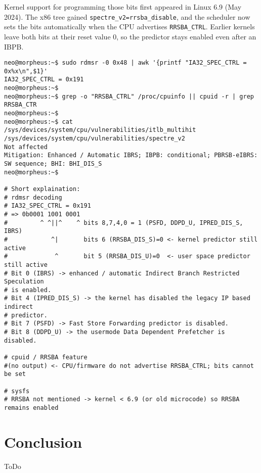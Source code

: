 \documentclass[11pt,a4paper]{article}
\begin{document}
Kernel support for programming those bits first appeared in Linux 6.9 (May 2024).  The x86 tree gained \texttt{spectre\_v2=rrsba\_disable}, and the scheduler now sets the bits automatically when the CPU advertises \texttt{RRSBA\_CTRL}. Earlier kernels leave both bits at their reset value 0, so the predictor stays enabled even after an IBPB.\\

\vspace{-0.5em}
\begin{lstlisting}[style=bash-nonitalic, caption={\texttt{attacker\_rrsba\_injection\_test.sh}}]
neo@morpheus:~$ sudo rdmsr -0 0x48 | awk '{printf "IA32_SPEC_CTRL = 0x%x\n",$1}'
IA32_SPEC_CTRL = 0x191
neo@morpheus:~$
neo@morpheus:~$ grep -o "RRSBA_CTRL" /proc/cpuinfo || cpuid -r | grep RRSBA_CTR
neo@morpheus:~$
neo@morpheus:~$ cat /sys/devices/system/cpu/vulnerabilities/itlb_multihit /sys/devices/system/cpu/vulnerabilities/spectre_v2
Not affected
Mitigation: Enhanced / Automatic IBRS; IBPB: conditional; PBRSB-eIBRS: SW sequence; BHI: BHI_DIS_S
neo@morpheus:~$

# Short explaination:
# rdmsr decoding
# IA32_SPEC_CTRL = 0x191
# => 0b0001 1001 0001
#         ^ ^||^    ^ bits 8,7,4,0 = 1 (PSFD, DDPD_U, IPRED_DIS_S, IBRS)
#            ^|       bits 6 (RRSBA_DIS_S)=0 <- kernel predictor still active
#             ^       bit 5 (RRSBA_DIS_U)=0  <- user space predictor still active
# Bit 0 (IBRS) -> enhanced / automatic Indirect Branch Restricted Speculation
# is enabled.
# Bit 4 (IPRED_DIS_S) -> the kernel has disabled the legacy IP based indirect
# predictor.
# Bit 7 (PSFD) -> Fast Store Forwarding predictor is disabled.
# Bit 8 (DDPD_U) -> the usermode Data Dependent Prefetcher is disabled.

# cpuid / RRSBA feature
#(no output) <- CPU/firmware do not advertise RRSBA_CTRL; bits cannot be set

# sysfs
# RRSBA not mentioned -> kernel < 6.9 (or old microcode) so RRSBA remains enabled
\end{lstlisting}


\section{Conclusion}
ToDo


\end{document}
